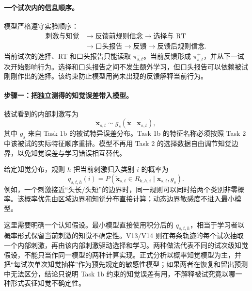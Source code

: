 \paragraph{一个试次内的信息顺序。}
模型严格遵守实验顺序：
\begin{equation}
\begin{aligned}
\text{刺激与知觉}
&\longrightarrow \text{反馈前规则信念}
\longrightarrow \text{选择与 RT}\\
&\longrightarrow \text{口头报告}
\longrightarrow \text{反馈}
\longrightarrow \text{反馈后规则信念}.
\end{aligned}
\label{eq:newplan-timeline}
\end{equation}
当前试次的选择、RT 和口头报告只能读取 $\pi^-_{s,t}$。当前反馈形成 $\pi^+_{s,t}$，并从下一试次开始影响行为。选择和口头报告之间不发生额外学习，但口头报告可以依赖被试刚刚作出的选择。该约束防止模型用尚未出现的反馈解释当前行为。

\paragraph{步骤一：把独立测得的知觉误差带入模型。}
被试看到的内部刺激写为
\begin{equation}
    \widetilde{\mathbf x}_{s,t}
    \sim g_s(\widetilde{\mathbf x}\mid\mathbf x_{s,t}),
    \label{eq:newplan-perception}
\end{equation}
其中 $g_s$ 来自 Task 1b 的被试特异误差分布。Task 1b 的特征名称必须按照 Task 2 中该被试的实际特征顺序重排。模型不再用 Task 2 的选择数据自由调节知觉边界，以免知觉误差与学习错误相互替代。

给定知觉分布，规则 $h$ 把当前刺激归入类别 $i$ 的概率为
\begin{equation}
    q_{s,t,h}(i)
    =P\!\left(
      \widetilde{\mathbf x}_{s,t}\in R_{k,h,i}
      \mid\mathbf x_{s,t},g_s
    \right).
    \label{eq:newplan-rule-prediction}
\end{equation}
例如，一个刺激接近“头长/头短”的边界时，同一规则可以同时给两个类别非零概率。该概率优先由区域边界和知觉分布直接计算；动态边界敏感度不进入最小模型。

这里需要明确一个认知假设。最小模型直接使用积分后的 $q_{s,t,h}$，相当于学习者以概率形式保留当前刺激的知觉不确定性。V13/V14 则在每条轨迹的每个试次抽取一个内部刺激，再由该内部刺激驱动选择和学习。两种做法代表不同的试次级知觉假设，不能只当作同一模型的两种计算实现。正式分析以概率知觉模型为主，并把“每试次单次知觉抽样”作为预先规定的敏感性模型；如果两者在恢复和留出预测中无法区分，结论只说明 Task 1b 约束的知觉误差有用，不解释被试究竟以哪一种形式表征知觉不确定性。

